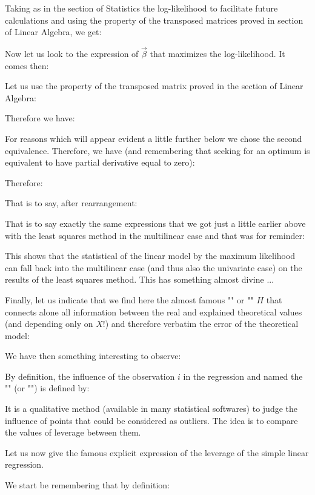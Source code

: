 	Taking as in the section of Statistics the log-likelihood to facilitate future calculations and using the property of the transposed matrices proved in section of Linear Algebra, we get:
	
	Now let us look to the expression of $\vec{\beta}$ that maximizes the log-likelihood. It comes then:
	
	Let us use the property of the transposed matrix proved in the section of Linear Algebra:
	
	Therefore we have:
	
	For reasons which will appear evident a little further below we chose the second equivalence. Therefore, we have (and remembering that seeking for an optimum is equivalent to have partial derivative equal to zero):
	
	Therefore:
	
	That is to say, after rearrangement:
	
	That is to say exactly the same expressions that we got just a little earlier above with the least squares method in the multilinear case and that was for reminder:
	
	This shows that the statistical of the linear model by the maximum likelihood can fall back into the multilinear case (and thus also the univariate case) on the results of the least squares method. This has something almost divine ...
	
	Finally, let us indicate that we find here the almost famous "" or "" $H$ that connects alone all information between the real and explained theoretical values (and depending only on $X$!) and therefore verbatim the error of the theoretical model:
	
	We have then something interesting to observe:
	
	By definition, the influence of the observation $i$ in the regression and named the  "" (or "") is defined by:
	
	It is a qualitative method (available in many statistical softwares) to judge the influence of points that could be considered as outliers. The idea is to compare the values of leverage between them.
	
	Let us now give the famous explicit expression of the leverage of the simple linear regression.

	We start be remembering that by definition:
	

